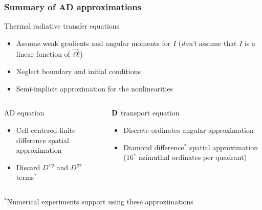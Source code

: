 \documentclass{beamer}
\begin{document}
\begin{frame}
  \frametitle{Summary of AD approximations}
  \begin{block}{Thermal radiative transfer equations}
    \begin{itemize}
      \item Assume weak gradients and angular moments for $I$ (\emph{don't}
        assume that $I$ is a linear function of $\vec{\Omega}$!)
      \item Neglect boundary and initial conditions
      \item Semi-implicit approximation for the nonlinearities
    \end{itemize}
  \end{block}
  \vspace{-\baselineskip}
  \begin{columns}[t]
    \begin{column}{.48\textwidth}
  \begin{block}{AD equation}
    \begin{itemize}
      \item Cell-centered finite difference spatial approximation
      \item Discard $D^{xy}$ and $D^{yx}$ terms$^*$
    \end{itemize}
  \end{block}
    \end{column}
    \begin{column}{.48\textwidth}
  \begin{block}{$\mathbf{D}$ transport equation}
    \begin{itemize}
      \item Discrete ordinates angular approximation
      \item Diamond difference$^*$ spatial approximation (16$^*$ azimuthal
        ordinates per quadrant)
    \end{itemize}
  \end{block}
    \end{column}
  \end{columns}
  {\small $^*$Numerical experiments support using these approximations}
\end{frame}

\end{document}
